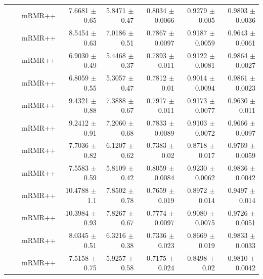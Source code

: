 \begin{longtable}{llp{}rrrrr}
 &  & mRMR++ & 7.6681 {\scriptsize $\pm$ 0.65} & 5.8471 {\scriptsize $\pm$ 0.47} & 0.8034 {\scriptsize $\pm$ 0.0066} & 0.9279 {\scriptsize $\pm$ 0.005} & 0.9803 {\scriptsize $\pm$ 0.0036} \\
 &  & mRMR++ & 8.5454 {\scriptsize $\pm$ 0.63} & 7.0186 {\scriptsize $\pm$ 0.51} & 0.7867 {\scriptsize $\pm$ 0.0097} & 0.9187 {\scriptsize $\pm$ 0.0059} & 0.9643 {\scriptsize $\pm$ 0.0061} \\
 &  & mRMR++ & 6.9030 {\scriptsize $\pm$ 0.49} & 5.4468 {\scriptsize $\pm$ 0.37} & 0.7893 {\scriptsize $\pm$ 0.011} & 0.9122 {\scriptsize $\pm$ 0.0081} & 0.9864 {\scriptsize $\pm$ 0.0027} \\
 &  & mRMR++ & 6.8059 {\scriptsize $\pm$ 0.55} & 5.3057 {\scriptsize $\pm$ 0.47} & 0.7812 {\scriptsize $\pm$ 0.01} & 0.9014 {\scriptsize $\pm$ 0.0094} & 0.9861 {\scriptsize $\pm$ 0.0023} \\
 &  & mRMR++ & 9.4321 {\scriptsize $\pm$ 0.88} & 7.3888 {\scriptsize $\pm$ 0.67} & 0.7917 {\scriptsize $\pm$ 0.011} & 0.9173 {\scriptsize $\pm$ 0.0077} & 0.9630 {\scriptsize $\pm$ 0.011} \\
 &  & mRMR++ & 9.2412 {\scriptsize $\pm$ 0.91} & 7.2060 {\scriptsize $\pm$ 0.68} & 0.7833 {\scriptsize $\pm$ 0.0089} & 0.9103 {\scriptsize $\pm$ 0.0072} & 0.9666 {\scriptsize $\pm$ 0.0097} \\
 &  & mRMR++ & 7.7036 {\scriptsize $\pm$ 0.82} & 6.1207 {\scriptsize $\pm$ 0.62} & 0.7383 {\scriptsize $\pm$ 0.02} & 0.8718 {\scriptsize $\pm$ 0.017} & 0.9769 {\scriptsize $\pm$ 0.0059} \\
 &  & mRMR++ & 7.5583 {\scriptsize $\pm$ 0.59} & 5.8109 {\scriptsize $\pm$ 0.42} & 0.8059 {\scriptsize $\pm$ 0.0084} & 0.9230 {\scriptsize $\pm$ 0.0062} & 0.9836 {\scriptsize $\pm$ 0.0042} \\
 &  & mRMR++ & 10.4788 {\scriptsize $\pm$ 1.1} & 7.8502 {\scriptsize $\pm$ 0.78} & 0.7659 {\scriptsize $\pm$ 0.019} & 0.8972 {\scriptsize $\pm$ 0.014} & 0.9497 {\scriptsize $\pm$ 0.014} \\
 &  & mRMR++ & 10.3984 {\scriptsize $\pm$ 0.93} & 7.8267 {\scriptsize $\pm$ 0.67} & 0.7774 {\scriptsize $\pm$ 0.0097} & 0.9080 {\scriptsize $\pm$ 0.0075} & 0.9726 {\scriptsize $\pm$ 0.0051} \\
 &  & mRMR++ & 8.0345 {\scriptsize $\pm$ 0.51} & 6.3216 {\scriptsize $\pm$ 0.38} & 0.7336 {\scriptsize $\pm$ 0.023} & 0.8669 {\scriptsize $\pm$ 0.019} & 0.9833 {\scriptsize $\pm$ 0.0033} \\
 &  & mRMR++ & 7.5158 {\scriptsize $\pm$ 0.75} & 5.9257 {\scriptsize $\pm$ 0.58} & 0.7175 {\scriptsize $\pm$ 0.024} & 0.8498 {\scriptsize $\pm$ 0.02} & 0.9810 {\scriptsize $\pm$ 0.0042} \\

\end{longtable}
